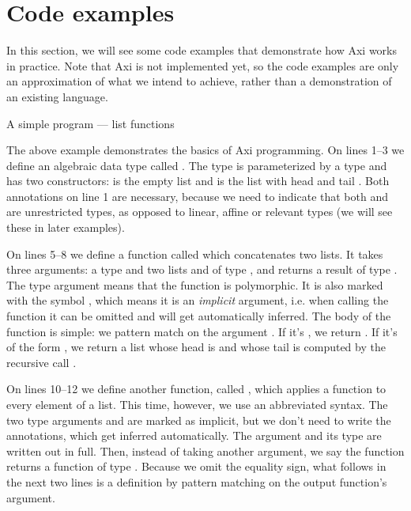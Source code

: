 \section{Code examples}

In this section, we will see some code examples that demonstrate how Axi works in practice. Note that Axi is not implemented yet, so the code examples are only an approximation of what we intend to achieve, rather than a demonstration of an existing language.

\begin{example}{A simple program --- list functions}



\end{example}

The above example demonstrates the basics of Axi programming. On lines 1--3 we define an algebraic data type called . The type is parameterized by a type  and has two constructors:  is the empty list and  is the list with head  and tail . Both  annotations on line 1 are necessary, because we need to indicate that both  and  are unrestricted types, as opposed to linear, affine or relevant types (we will see these in later examples).

On lines 5--8 we define a function called  which concatenates two lists. It takes three arguments: a type  and two lists  and  of type , and returns a result of type . The type argument means that the function is polymorphic. It is also marked with the symbol , which means it is an \textit{implicit} argument, i.e. when calling the function it can be omitted and will get automatically inferred. The body of the function is simple: we pattern match on the argument . If it's , we return . If it's of the form , we return a list whose head is  and whose tail is computed by the recursive call .

On lines 10--12 we define another function, called , which applies a function  to every element of a list. This time, however, we use an abbreviated syntax. The two type arguments  and  are marked as implicit, but we don't need to write the  annotations, which get inferred automatically. The argument  and its type are written out in full. Then, instead of taking another argument, we say the function returns a function of type . Because we omit the equality sign, what follows in the next two lines is a definition by pattern matching on the output function's  argument.

